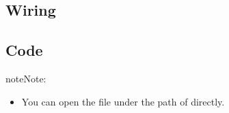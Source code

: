 \documentclass[a4paper,11pt,english]{sphinxmanual}
\begin{document}
\subsection{Wiring}
\label{\detokenize{Extension_Project/Digital_Dice_LED_Matrix:wiring}}




\subsection{Code}
\label{\detokenize{Extension_Project/Digital_Dice_LED_Matrix:code}}
\begin{sphinxadmonition}{note}{Note:}\begin{itemize}
\item {} 
\sphinxAtStartPar
You can open the file  under the path of  directly.

\end{itemize}
\end{sphinxadmonition}
\end{document}
